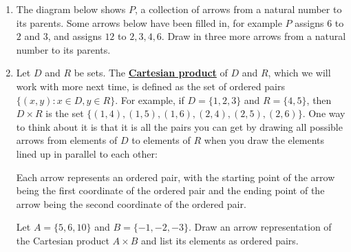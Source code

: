 \documentclass[11pt]{article}
\newcommand{\N}{\mathbb{N}}
\newcommand\st{:}
\renewcommand\emph[1]{\underline{\bf{#1}}} %
\theoremstyle{definition}
\begin{document}
\begin{enumerate}
\item \label{p: parent relation intro}
The diagram below shows $P$, a collection of arrows from a natural number to its parents.   Some arrows below have been filled in, for example $P$ assigns $6$ to $2$ and $3$, and assigns $12$ to $2, 3, 4, 6$.  Draw in three more arrows from a natural number to its parents.

\begin{center}
\end{center}


\item  %
\label{p: cart prod}
Let $D$ and $R$ be sets. The \emph{Cartesian product} of $D$ and $R$, which we will work with more next time, is defined as the set of ordered pairs $\{(x,y) \st x\in D, y\in R\}$. For example, if $D=\{1, 2, 3\}$ and $R=\{4, 5\}$, then $D\times R$ is the set $\{(1, 4),(1,5), (1, 6), (2, 4), (2, 5), (2, 6)\}$. One way to think about it is that it is all the pairs you can get by drawing all possible arrows from elements of $D$ to elements of $R$ when you draw the elements lined up in parallel to each other:

	\begin{center}
	\end{center}
	
Each arrow represents an ordered pair, with the starting point of the arrow being the first coordinate of the ordered pair and the ending point of the arrow being the second coordinate of the ordered pair.

Let $A=\{5, 6, 10\}$ and $B=\{-1, -2, -3\}$. Draw an arrow representation of the Cartesian product $A\times B$ and list its elements as ordered pairs.
\end{enumerate}
\end{document}
